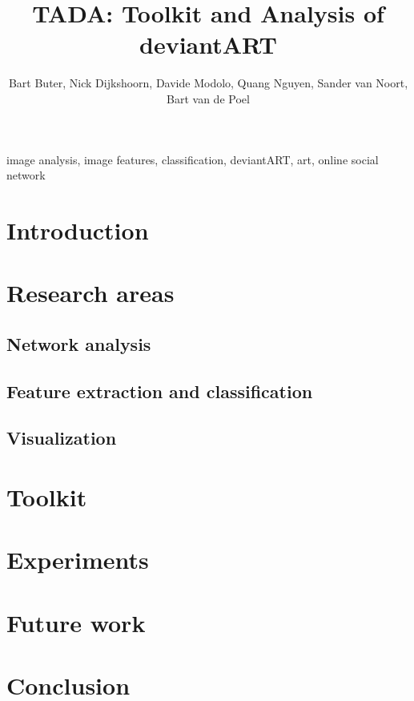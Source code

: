 \documentclass[10pt,journal,compsoc]{IEEEtran}
\begin{document}
\title{TADA: Toolkit and Analysis of deviantART}
\author{Bart Buter, Nick Dijkshoorn, Davide Modolo, Quang Nguyen, Sander van Noort, Bart van de Poel}

\maketitle


\begin{abstract}

\end{abstract}


\begin{keywords}
image analysis, image features, classification, deviantART, art, online social network
\end{keywords}


\section{Introduction}



\section{Research areas}
	\subsection{Network analysis}
	
	\subsection{Feature extraction and classification}
	
	\subsection{Visualization}
	


\section{Toolkit}


\section{Experiments}



\section{Future work}


\section{Conclusion}


%

\nocite{*}



\pagebreak
\tableofcontents
\end{document}
